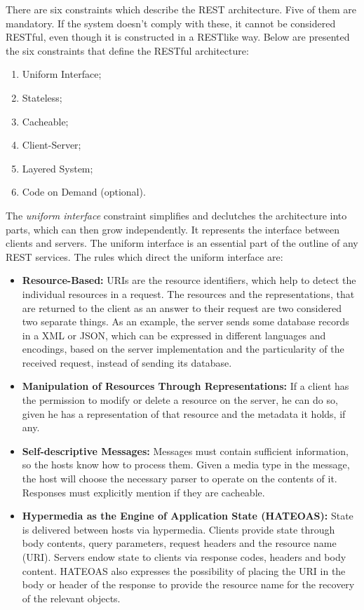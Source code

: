 There are six constraints which describe the REST architecture. Five of them are mandatory. If the system doesn't comply with these, it cannot be considered RESTful, even though it is constructed in a RESTlike way.
Below are presented the six constraints that define the RESTful architecture:
\begin{enumerate}
  \item Uniform Interface;
  \item Stateless;
  \item Cacheable;
  \item Client-Server;
  \item Layered System;
  \item Code on Demand (optional).
\end{enumerate}
    
The \textit{uniform interface} constraint simplifies and declutches the architecture into parts, which can then grow independently. It represents the interface between clients and servers. The uniform interface is an essential part of the outline of any REST services.  The rules which direct the uniform interface are:

\begin{itemize}
  \item {\bf Resource-Based:} URIs are the resource identifiers, which help to detect the individual resources in a request. The resources and the representations, that are returned to the client as an answer to their request are two considered two separate things. As an example, the server sends some database records in a XML or JSON, which can be expressed in different languages and encodings, based on the server implementation and the particularity of the received request, instead of sending its database.

  \item {\bf Manipulation of Resources Through Representations:} If a client has the permission to modify or delete a resource on the server, he can do so, given he has a representation of that resource and the metadata it holds, if any.

  \item {\bf Self-descriptive Messages:} Messages must contain sufficient information, so the hosts know how to process them. Given a media type in the message, the host will choose the necessary parser to operate on the contents of it. Responses must explicitly mention if they are cacheable.

  \item {\bf Hypermedia as the Engine of Application State (HATEOAS):} State is delivered between hosts via hypermedia. Clients provide state through body contents, query parameters, request headers and the resource name (URI). Servers endow state to clients via response codes, headers and body content. HATEOAS also expresses the possibility of placing the URI in the body or header of the response to provide the resource name for the recovery of the relevant objects.
\end{itemize}

